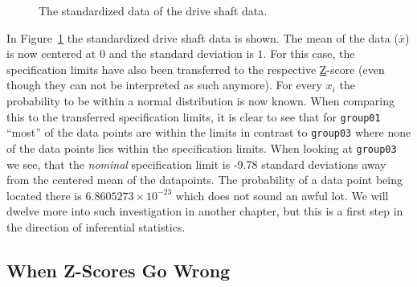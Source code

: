 \documentclass[
  a4paper,
]{scrbook}
\begin{document}
\begin{figure}[H]


\caption{\label{fig-ds-z}The standardized data of the drive shaft data.}

\end{figure}%

In Figure~\ref{fig-ds-z} the standardized drive shaft data is shown. The
mean of the data (\(\bar{x}\)) is now centered at \(0\) and the standard
deviation is \(1\). For this case, the specification limits have also
been transferred to the respective \hyperref[acronyms_Z]{Z}-score (even
though they can not be interpreted as such anymore). For every \(x_i\)
the probability to be within a normal distribution is now known. When
comparing this to the transferred specification limits, it is clear to
see that for \texttt{group01} ``most'' of the data points are within the
limits in contrast to \texttt{group03} where none of the data points
lies within the specification limits. When looking at \texttt{group03}
we see, that the \emph{nominal} specification limit is -9.78 standard
deviations away from the centered mean of the datapoints. The
probability of a data point being located there is
\ensuremath{6.8605273\times 10^{-23}} which does not sound an awful lot.
We will dwelve more into such investigation in another chapter, but this
is a first step in the direction of inferential statistics.

\subsection{When Z-Scores Go Wrong}\label{when-z-scores-go-wrong}
\end{document}
